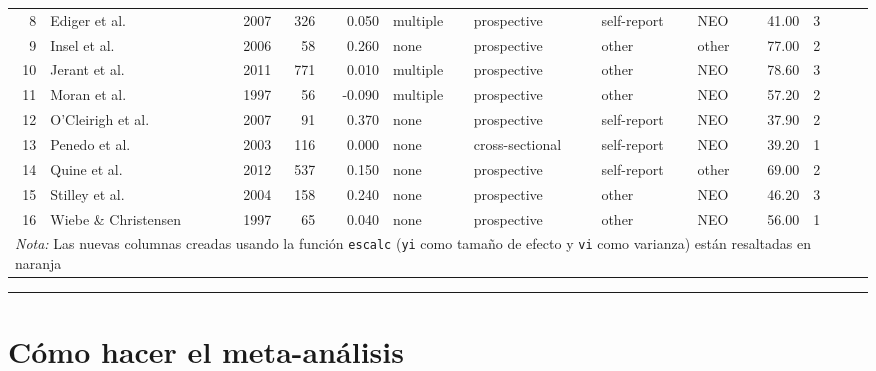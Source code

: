 \documentclass[
  bookmarksnumbered]{article}
\begin{document}
\begin{table}[H]
{\begin{tabular}[t]{rlrrrllllrl>{}r>{}r}
8 & Ediger et al. & 2007 & 326 & 0.050 & multiple & prospective & self-report & NEO & 41.00 & 3 & \cellcolor[HTML]{f68212}{0.0500417} & \cellcolor[HTML]{f68212}{0.0030960}\\
9 & Insel et al. & 2006 & 58 & 0.260 & none & prospective & other & other & 77.00 & 2 & \cellcolor[HTML]{f68212}{0.2661084} & \cellcolor[HTML]{f68212}{0.0181818}\\
10 & Jerant et al. & 2011 & 771 & 0.010 & multiple & prospective & other & NEO & 78.60 & 3 & \cellcolor[HTML]{f68212}{0.0100003} & \cellcolor[HTML]{f68212}{0.0013021}\\
11 & Moran et al. & 1997 & 56 & -0.090 & multiple & prospective & other & NEO & 57.20 & 2 & \cellcolor[HTML]{f68212}{-0.0902442} & \cellcolor[HTML]{f68212}{0.0188679}\\
12 & O'Cleirigh et al. & 2007 & 91 & 0.370 & none & prospective & self-report & NEO & 37.90 & 2 & \cellcolor[HTML]{f68212}{0.3884231} & \cellcolor[HTML]{f68212}{0.0113636}\\
13 & Penedo et al. & 2003 & 116 & 0.000 & none & cross-sectional & self-report & NEO & 39.20 & 1 & \cellcolor[HTML]{f68212}{0.0000000} & \cellcolor[HTML]{f68212}{0.0088496}\\
14 & Quine et al. & 2012 & 537 & 0.150 & none & prospective & self-report & other & 69.00 & 2 & \cellcolor[HTML]{f68212}{0.1511404} & \cellcolor[HTML]{f68212}{0.0018727}\\
15 & Stilley et al. & 2004 & 158 & 0.240 & none & prospective & other & NEO & 46.20 & 3 & \cellcolor[HTML]{f68212}{0.2447741} & \cellcolor[HTML]{f68212}{0.0064516}\\
16 & Wiebe \& Christensen & 1997 & 65 & 0.040 & none & prospective & other & NEO & 56.00 & 1 & \cellcolor[HTML]{f68212}{0.0400214} & \cellcolor[HTML]{f68212}{0.0161290}\\
\bottomrule
\multicolumn{13}{l}{\rule{0pt}{1em}\textit{Nota:} Las nuevas columnas creadas usando la función \texttt{escalc} 
           (\texttt{yi} como tamaño de efecto y \texttt{vi} como varianza) están 
           resaltadas en naranja}\\
\end{tabular}}
\end{table}

\begin{center}\rule{0.5\linewidth}{0.5pt}\end{center}

\hypertarget{meta-cor}{%
\section{Cómo hacer el meta-análisis}\label{meta-cor}}
\end{document}
